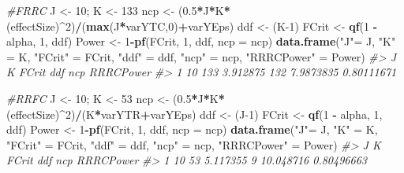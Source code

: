 \documentclass[
]{book}
\newenvironment{Shaded}{\begin{snugshade}}{\end{snugshade}}
\newcommand{\CommentTok}[1]{\textcolor[rgb]{0.56,0.35,0.01}{\textit{#1}}}
\newcommand{\DataTypeTok}[1]{\textcolor[rgb]{0.13,0.29,0.53}{#1}}
\newcommand{\DecValTok}[1]{\textcolor[rgb]{0.00,0.00,0.81}{#1}}
\newcommand{\FloatTok}[1]{\textcolor[rgb]{0.00,0.00,0.81}{#1}}
\newcommand{\KeywordTok}[1]{\textcolor[rgb]{0.13,0.29,0.53}{\textbf{#1}}}
\newcommand{\NormalTok}[1]{#1}
\newcommand{\OperatorTok}[1]{\textcolor[rgb]{0.81,0.36,0.00}{\textbf{#1}}}
\newcommand{\StringTok}[1]{\textcolor[rgb]{0.31,0.60,0.02}{#1}}
\begin{document}
\begin{Shaded}
\begin{Highlighting}[]
\CommentTok{#FRRC}
\NormalTok{J <-}\StringTok{ }\DecValTok{10}\NormalTok{; K <-}\StringTok{ }\DecValTok{133}
\NormalTok{ncp <-}\StringTok{ }\NormalTok{(}\FloatTok{0.5}\OperatorTok{*}\NormalTok{J}\OperatorTok{*}\NormalTok{K}\OperatorTok{*}\NormalTok{(effectSize)}\OperatorTok{^}\DecValTok{2}\NormalTok{)}\OperatorTok{/}\NormalTok{(}\KeywordTok{max}\NormalTok{(J}\OperatorTok{*}\NormalTok{varYTC,}\DecValTok{0}\NormalTok{)}\OperatorTok{+}\NormalTok{varYEps)}
\NormalTok{ddf <-}\StringTok{ }\NormalTok{(K}\DecValTok{-1}\NormalTok{)}
\NormalTok{FCrit <-}\StringTok{ }\KeywordTok{qf}\NormalTok{(}\DecValTok{1} \OperatorTok{-}\StringTok{ }\NormalTok{alpha, }\DecValTok{1}\NormalTok{, ddf)}
\NormalTok{Power <-}\StringTok{ }\DecValTok{1}\OperatorTok{-}\KeywordTok{pf}\NormalTok{(FCrit, }\DecValTok{1}\NormalTok{, ddf, }\DataTypeTok{ncp =}\NormalTok{ ncp)}
\KeywordTok{data.frame}\NormalTok{(}\StringTok{"J"}\NormalTok{=}\StringTok{ }\NormalTok{J,  }\StringTok{"K"}\NormalTok{ =}\StringTok{ }\NormalTok{K, }\StringTok{"FCrit"}\NormalTok{ =}\StringTok{ }\NormalTok{FCrit, }\StringTok{"ddf"}\NormalTok{ =}\StringTok{ }\NormalTok{ddf, }\StringTok{"ncp"}\NormalTok{ =}\StringTok{ }\NormalTok{ncp, }\StringTok{"RRRCPower"}\NormalTok{ =}\StringTok{ }\NormalTok{Power)}
\CommentTok{#>    J   K    FCrit ddf       ncp  RRRCPower}
\CommentTok{#> 1 10 133 3.912875 132 7.9873835 0.80111671}

\CommentTok{#RRFC}
\NormalTok{J <-}\StringTok{ }\DecValTok{10}\NormalTok{; K <-}\StringTok{ }\DecValTok{53}
\NormalTok{ncp <-}\StringTok{ }\NormalTok{(}\FloatTok{0.5}\OperatorTok{*}\NormalTok{J}\OperatorTok{*}\NormalTok{K}\OperatorTok{*}\NormalTok{(effectSize)}\OperatorTok{^}\DecValTok{2}\NormalTok{)}\OperatorTok{/}\NormalTok{(K}\OperatorTok{*}\NormalTok{varYTR}\OperatorTok{+}\NormalTok{varYEps)}
\NormalTok{ddf <-}\StringTok{ }\NormalTok{(J}\DecValTok{-1}\NormalTok{)}
\NormalTok{FCrit <-}\StringTok{ }\KeywordTok{qf}\NormalTok{(}\DecValTok{1} \OperatorTok{-}\StringTok{ }\NormalTok{alpha, }\DecValTok{1}\NormalTok{, ddf)}
\NormalTok{Power <-}\StringTok{ }\DecValTok{1}\OperatorTok{-}\KeywordTok{pf}\NormalTok{(FCrit, }\DecValTok{1}\NormalTok{, ddf, }\DataTypeTok{ncp =}\NormalTok{ ncp)}
\KeywordTok{data.frame}\NormalTok{(}\StringTok{"J"}\NormalTok{=}\StringTok{ }\NormalTok{J,  }\StringTok{"K"}\NormalTok{ =}\StringTok{ }\NormalTok{K, }\StringTok{"FCrit"}\NormalTok{ =}\StringTok{ }\NormalTok{FCrit, }\StringTok{"ddf"}\NormalTok{ =}\StringTok{ }\NormalTok{ddf, }\StringTok{"ncp"}\NormalTok{ =}\StringTok{ }\NormalTok{ncp, }\StringTok{"RRRCPower"}\NormalTok{ =}\StringTok{ }\NormalTok{Power)}
\CommentTok{#>    J  K    FCrit ddf       ncp  RRRCPower}
\CommentTok{#> 1 10 53 5.117355   9 10.048716 0.80496663}
\end{Highlighting}
\end{Shaded}
\end{document}
